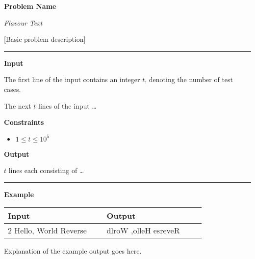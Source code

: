 \LARGE \textbf{Problem Name} \normalsize

{\itshape Flavour Text}

[Basic problem description]

\vspace{8pt}
\hrule

\textbf{Input}

The first line of the input contains an integer $t$, denoting the number of test cases.

The next $t$ lines of the input \dots

\textbf{Constraints}

\begin{itemize}
    \item $1 \leq t \leq 10^5$
\end{itemize}

\textbf{Output}

$t$ lines each consisting of \dots

\vspace{8pt}
\hrule

\textbf{Example}

\begin{table}[h]
    \centering
    \begin{tabular}{|p{0.4\linewidth}|p{0.4\linewidth}|}
        \hline
        Input & Output \\
        \hline
        2 \newline Hello, World \newline Reverse & 
        dlroW ,olleH \newline esreveR \\
        \hline
    \end{tabular}
\end{table}

Explanation of the example output goes here.